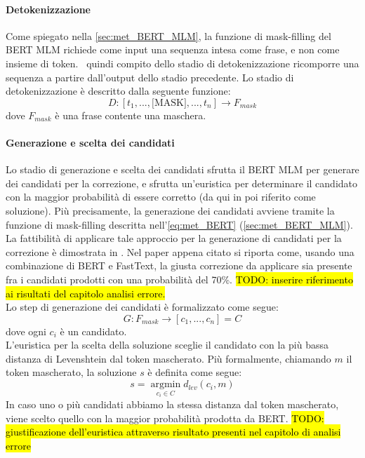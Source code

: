 \paragraph{Detokenizzazione}
Come spiegato nella \autoref{sec:met_BERT_MLM}, la funzione di mask-filling del BERT MLM richiede come input una sequenza intesa come frase, e non come insieme di token. \E\ quindi compito dello stadio di detokenizzazione ricomporre una sequenza a partire dall'output dello stadio precedente. Lo stadio di detokenizzazione è descritto dalla seguente funzione:
\begin{equation}
D: [t_1,...,\text{[MASK]},...,t_n] \rightarrow F_{mask}
\end{equation}
dove $F_{mask}$ è una frase contente una maschera.

\paragraph{Generazione e scelta dei candidati}
Lo stadio di generazione e scelta dei candidati sfrutta il BERT MLM per generare dei candidati per la correzione, e sfrutta un'euristica per determinare il candidato con la maggior probabilità di essere corretto (da qui in poi riferito come soluzione). Più precisamente, la generazione dei candidati avviene tramite la funzione di mask-filling descritta nell'\autoref{eq:met_BERT} (\autoref{sec:met_BERT_MLM}). La fattibilità di applicare tale approccio per la generazione di candidati per la correzione è dimostrata in \cite{OCRMaskFilling}. Nel paper appena citato si riporta come, usando una combinazione di BERT e FastText, la giusta correzione da applicare sia presente fra i candidati prodotti con una probabilità del 70\%. \hl{TODO: inserire riferimento ai risultati del capitolo analisi errore.}\\
Lo step di generazione dei candidati è formalizzato come segue:
\begin{equation}
G: F_{mask} \rightarrow [c_1,...,c_n]= C
\end{equation}
dove ogni $c_i$ è un candidato.\\
L'euristica per la scelta della soluzione sceglie il candidato con la più bassa distanza di Levenshtein dal token mascherato. Più formalmente, chiamando $m$ il token mascherato, la soluzione $s$ è definita come segue:
\begin{equation}
s = \operatorname*{argmin}_{c_i \in C} d_{lev}(c_i,m)
\end{equation}
In caso uno o più candidati abbiamo la stessa distanza dal token mascherato, viene scelto quello con la maggior probabilità prodotta da BERT.
\hl{TODO: giustificazione dell'euristica attraverso risultato presenti nel capitolo di analisi errore}

